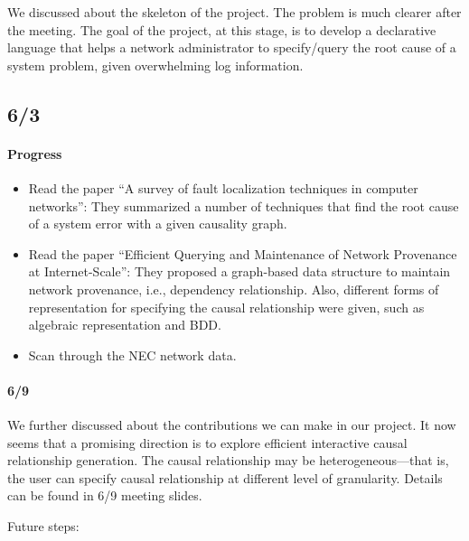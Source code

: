 \documentclass{article}
\begin{document}
We discussed about the skeleton of the project. The problem is much clearer
after the meeting. The goal of the project, at this stage, is to develop a
declarative language that helps a network administrator to specify/query the root cause of a
system problem, given overwhelming log information.

\subsection{6/3}
\label{sec:meeting:63}

\paragraph{Progress}
\begin{itemize}
\item Read the paper ``A survey of fault localization techniques in computer
networks'': They summarized a number of techniques that find the root cause of a
system error with a given causality graph. 

\item Read the paper ``Efficient Querying and Maintenance of Network Provenance at
Internet-Scale'': They proposed a graph-based data structure to maintain network
provenance, i.e., dependency relationship. Also, different forms of
representation for specifying the causal relationship were given, such as
algebraic representation and BDD.

\item Scan through the NEC network data.
\end{itemize}

\paragraph{6/9}

We further discussed about the contributions we can make in our project. It now
seems that a promising direction is to explore efficient interactive causal
relationship generation. The causal relationship may be heterogeneous---that is,
the user can specify causal relationship at different level of granularity. Details can be found in 6/9 meeting slides.

Future steps:
\end{document}

